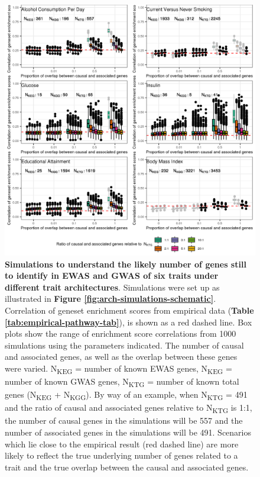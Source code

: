 \documentclass[11pt,twoside]{bristolthesis}
\begin{document}
\begin{figure}

{\centering \includegraphics[width=1\linewidth]{figure/06-ewas_gwas_comparison/architecture_sims_other_traits_corr} 

}

\caption[Simulations to understand the likely number of genes still to identify in EWAS and GWAS of six traits under different trait architectures]{\textbf{Simulations to understand the likely number of genes still to identify in EWAS and GWAS of six traits under different trait architectures}. Simulations were set up as illustrated in \textbf{Figure \ref{fig:arch-simulations-schematic}}. Correlation of geneset enrichment scores from empirical data (\textbf{Table \ref{tab:empirical-pathway-tab}}), is shown as a red dashed line. Box plots show the range of enrichment score correlations from 1000 simulations using the parameters indicated. The number of causal and associated genes, as well as the overlap between these genes were varied. N\textsubscript{KEG} = number of known EWAS genes, N\textsubscript{KEG} = number of known GWAS genes, N\textsubscript{KTG} = number of known total genes (N\textsubscript{KEG} + N\textsubscript{KGG}). By way of an example, when N\textsubscript{KTG} = 491 and the ratio of causal and associated genes relative to N\textsubscript{KTG} is 1:1, the number of causal genes in the simulations will be 557 and the number of associated genes in the simulations will be 491. Scenarios which lie close to the empirical result (red dashed line) are more likely to reflect the true underlying number of genes related to a trait and the true overlap between the causal and associated genes.}\label{fig:arch-simulations-supp-res}
\end{figure}
\end{document}
